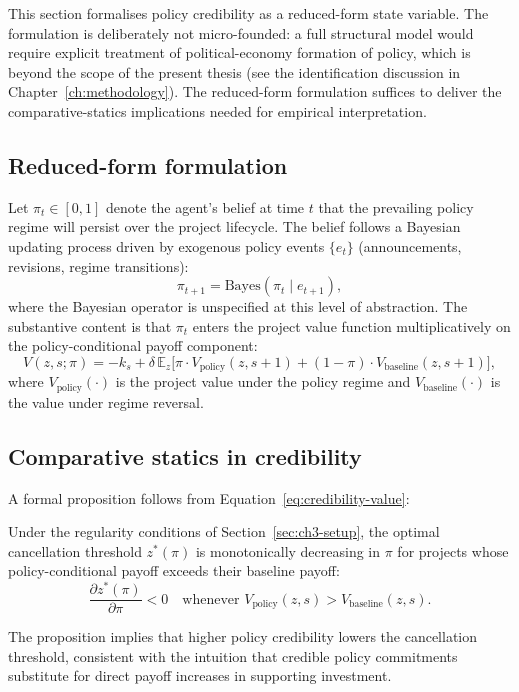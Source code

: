 This section formalises policy credibility as a reduced-form state variable. The formulation is deliberately not micro-founded: a full structural model would require explicit treatment of political-economy formation of policy, which is beyond the scope of the present thesis (see the identification discussion in Chapter~\ref{ch:methodology}). The reduced-form formulation suffices to deliver the comparative-statics implications needed for empirical interpretation.

\subsection{Reduced-form formulation}
\label{sec:ch3-credibility-formulation}

Let $\pi_t \in [0, 1]$ denote the agent's belief at time $t$ that the prevailing policy regime will persist over the project lifecycle. The belief follows a Bayesian updating process driven by exogenous policy events $\{e_t\}$ (announcements, revisions, regime transitions):
\begin{equation}
\pi_{t+1} = \mathrm{Bayes}(\pi_t \mid e_{t+1}),
\label{eq:credibility-bayes}
\end{equation}
where the Bayesian operator is unspecified at this level of abstraction. The substantive content is that $\pi_t$ enters the project value function multiplicatively on the policy-conditional payoff component:
\begin{equation}
V(z, s; \pi) = -k_s + \delta\, \mathbb{E}_z\!\Big[\pi \cdot V_{\text{policy}}(z, s+1) + (1 - \pi) \cdot V_{\text{baseline}}(z, s+1)\Big],
\label{eq:credibility-value}
\end{equation}
where $V_{\text{policy}}(\cdot)$ is the project value under the policy regime and $V_{\text{baseline}}(\cdot)$ is the value under regime reversal.

\subsection{Comparative statics in credibility}
\label{sec:ch3-credibility-statics}

A formal proposition follows from Equation~\eqref{eq:credibility-value}:

\begin{proposition}
\label{prop:credibility-threshold}
Under the regularity conditions of Section~\ref{sec:ch3-setup}, the optimal cancellation threshold $z^*(\pi)$ is monotonically decreasing in $\pi$ for projects whose policy-conditional payoff exceeds their baseline payoff:
\[
\frac{\partial z^*(\pi)}{\partial \pi} < 0 \quad \text{whenever } V_{\text{policy}}(z, s) > V_{\text{baseline}}(z, s).
\]
\end{proposition}
\noindent The proposition implies that higher policy credibility lowers the cancellation threshold, consistent with the intuition that credible policy commitments substitute for direct payoff increases in supporting investment.

